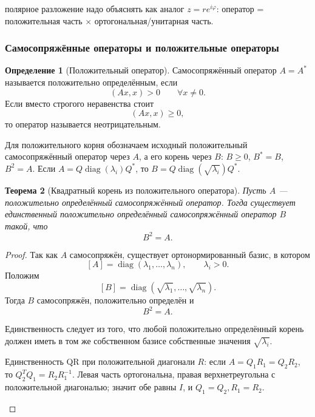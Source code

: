 \documentclass[12pt,a4paper]{article}
\theoremstyle{definition}
\newtheorem{definition}{Определение}[section]
\theoremstyle{plain}
\newtheorem{theorem}[definition]{Теорема}
\theoremstyle{remark}
\newenvironment{planadd}{\begin{planbox}}{\end{planbox}}
\newenvironment{knowledgefix}{\begin{clarifybox}}{\end{clarifybox}}
\newcommand{\diag}{\operatorname{diag}}
\begin{document}
\begin{planadd}

полярное разложение надо объяснять как аналог $z=re^{i\varphi}$: оператор = положительная часть $\times$ ортогональная/унитарная часть.

\end{planadd}

\subsubsection{Самосопряжённые операторы и положительные операторы}


\begin{definition}[Положительный оператор]
Самосопряжённый оператор $A=A^*$ называется положительно определённым, если
\[
    (Ax,x)>0
    \qquad \forall x\ne0.
\]
Если вместо строгого неравенства стоит
\[
    (Ax,x)\ge0,
\]
то оператор называется неотрицательным.
\begin{knowledgefix}
Для положительного корня обозначаем исходный положительный самосопряжённый оператор через \(A\), а его корень через \(B\): \(B\ge0\), \(B^*=B\), \(B^2=A\). Если \(A=Q\diag(\lambda_i)Q^*\), то \(B=Q\diag(\sqrt{\lambda_i})Q^*\).
\end{knowledgefix}
\end{definition}

\begin{theorem}[Квадратный корень из положительного оператора]
Пусть $A$ --- положительно определённый самосопряжённый оператор.
Тогда существует единственный положительно определённый самосопряжённый оператор $B$ такой, что
\[
    B^2=A.
\]
\end{theorem}

\begin{proof}
Так как $A$ самосопряжён, существует ортонормированный базис, в котором
\[
    [A]=\diag(\lambda_1,\ldots,\lambda_n),
    \qquad
    \lambda_i>0.
\]
Положим
\[
    [B]=\diag(\sqrt{\lambda_1},\ldots,\sqrt{\lambda_n}).
\]
Тогда $B$ самосопряжён, положительно определён и
\[
    B^2=A.
\]

Единственность следует из того, что любой положительно определённый корень должен иметь в том же собственном базисе собственные значения $\sqrt{\lambda_i}$.
\begin{knowledgefix}
Единственность QR при положительной диагонали \(R\): если \(A=Q_1R_1=Q_2R_2\), то \(Q_2^TQ_1=R_2R_1^{-1}\). Левая часть ортогональна, правая верхнетреугольна с положительной диагональю; значит обе равны \(I\), и \(Q_1=Q_2, R_1=R_2\).
\end{knowledgefix}
\end{proof}
\end{document}
